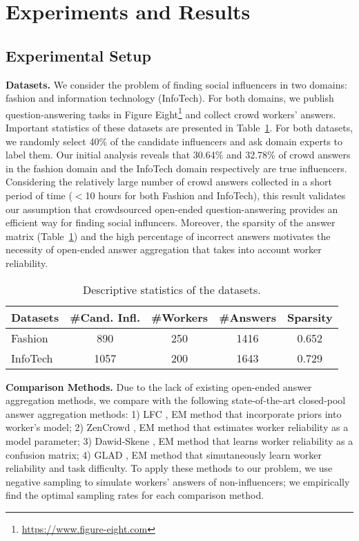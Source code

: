 \section{Experiments and Results}

\subsection{Experimental Setup}

\noindent\textbf{Datasets.} We consider the problem of finding social influencers in two domains: fashion and information technology (InfoTech). For both domains, we publish question-answering tasks in Figure Eight\footnote{\url{https://www.figure-eight.com}} and collect crowd workers' answers. Important statistics of these datasets are presented in Table~\ref{tab:datasets}. For both datasets, we randomly select 40\% of the candidate influencers and ask domain experts to label them. Our initial analysis reveals that 30.64\% and 32.78\%  of crowd answers in the fashion domain and the InfoTech domain respectively are true influencers. Considering the relatively large number of crowd answers collected in a short period of time ($<$10 hours for both Fashion and InfoTech), this result validates our assumption that crowdsourced open-ended question-answering provides an efficient way for finding social influncers. Moreover, the sparsity of the answer matrix (Table~\ref{tab:datasets}) and the high percentage of incorrect answers motivates the necessity of open-ended answer aggregation that takes into account worker reliability.

\begin{table}[!ht]
\centering \caption{Descriptive statistics of the
datasets.}\label{tab:datasets}
\addtolength{\tabcolsep}{-1mm}
\begin{tabular}{lcccc}
\toprule
    Datasets &\#Cand. Infl. &\#Workers &\#Answers &Sparsity   \\\midrule
    Fashion & 890 & 250 & 1416  & 0.652 \\
    InfoTech & 1057 & 200 &1643 & 0.729 \\
\bottomrule
\end{tabular}
\end{table}

\smallskip
\noindent\textbf{Comparison Methods.} Due to the lack of existing open-ended answer aggregation methods, we compare with the following state-of-the-art closed-pool answer aggregation methods: 1) LFC \cite{raykar2010learning}, EM method 
that incorporate priors into worker's model; 2) ZenCrowd \cite{demartini2012zencrowd}, EM method that estimates worker reliability as a model parameter; 3) Dawid-Skene \cite{dawid1979maximum}, EM method that learns worker reliability as a confusion matrix; 4) GLAD \cite{whitehill2009whose}, EM method that simutaneously learn worker reliability and task difficulty. To apply these methods to our problem, we use negative sampling to simulate workers' answers of non-influencers; we empirically find the optimal sampling rates for each comparison method. 

